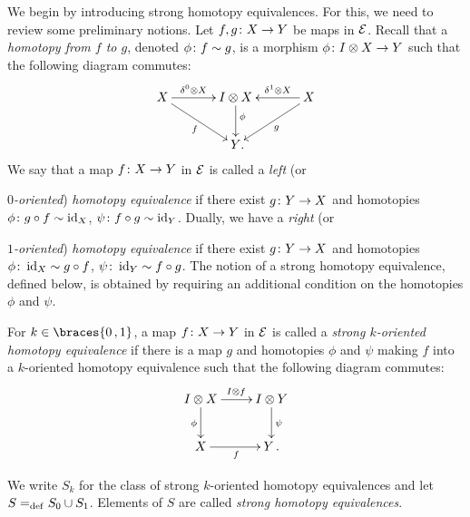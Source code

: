 \documentclass[reqno,10pt,a4paper,oneside,draft]{amsart}
\begin{document}
We begin by introducing strong homotopy equivalences.
For this, we need to review some preliminary notions.
Let $f, g \colon X \to Y$ be maps in $\mathcal{E}$.
Recall that a \emph{homotopy from $f$ to $g$}, denoted $\phi \colon f \sim g$, is a morphism $\phi \colon I \otimes X \to Y$ such that the following diagram commutes:
\begin{equation} \label{equ:homotopy}
\begin{gathered}
\xymatrix@C=1.2cm{
  X
  \ar[r]^-{\lcyl \otimes X}
  \ar[dr]_{f}
&
  \interval \otimes X
  \ar[d]^(0.4){\phi}
&
  X
  \ar[dl]^{g}
  \ar[l]_-{\rcyl \otimes X}
\\&
  Y
\rlap{.}}
\end{gathered}
\end{equation}
We say that a map $f \colon X \to Y$  in $\mathcal{E}$ is called a \emph{left} (or {\emph{$0$-oriented}) \emph{homotopy equivalence} if there exist $g \colon Y \to X$ and homotopies $\phi \colon g \mathbin{\circ} f \sim \operatorname{id}_X $, $\psi \colon f \mathbin{\circ} g \sim \operatorname{id}_Y$.
Dually, we have a \emph{right} (or {\emph{ $1$-oriented}) \emph{homotopy equivalence} if there exist $g \colon Y \to X$ and homotopies $\phi \colon \operatorname{id}_X \sim g \mathbin{\circ} f$, $\psi \colon \operatorname{id}_Y \sim f \mathbin{\circ} g$.
The notion of a strong homotopy equivalence, defined below, is obtained by requiring an additional condition on the homotopies $\phi$ and $\psi$.

\begin{definition} \label{def:strhe}
For $k \in \braces{0\,, 1}$, a map $f \colon X \to Y$  in $\mathcal{E}$ is called a \emph{strong $k$-oriented homotopy equivalence} if there is a map $g$ and homotopies $\phi$ and $\psi$ making $f$ into a $k$-oriented homotopy equivalence such that the following diagram commutes:
\[
\xymatrix{
  \interval \otimes X
  \ar[r]^{\interval \otimes f}
  \ar[d]_{\phi}
&
  \interval \otimes Y
  \ar[d]^{\psi}
\\
  X
  \ar[r]_{f}
&
  Y \, .
}
\]
\end{definition}

We write $S_k$ for the class of strong $k$-oriented homotopy equivalences and let~$S =_{\operatorname{def}} S_0 \cup S_1$.
Elements of $S$ are called \emph{strong homotopy equivalences}.

}}
\end{document}
